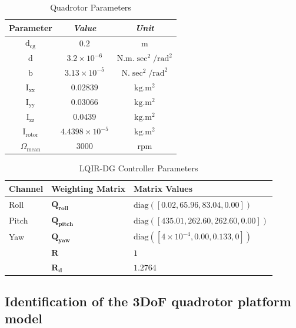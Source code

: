 \documentclass[3p,times]{elsarticle}
\begin{document}
\begin{table}[H]
	\renewcommand{\arraystretch}{1.3}
	\caption{Quadrotor Parameters}
	\begin{center}
	\begin{tabular}{c c c}
	\hline
	\textbf{Parameter} & \textbf{\textit{Value}}& \textbf{\textit{Unit}} \\
	\hline
	$\mathrm{d}_{\text{cg}}$  & $0.2$ & $\mathrm{m}$\\
	$\mathrm{d}$  & $3.2\times10^{-6}$ & $\mathrm{N.m.\sec^2/rad^2}$\\
	$\mathrm{b}$  & $3.13\times10^{-5}$ & $\mathrm{N.\sec^2/rad^2}$ \\
	$\mathrm{I}_{\text{xx}}$ & $0.02839$ & $\mathrm{kg.m^2}$ \\
	$\mathrm{I}_{\text{yy}}$  & $0.03066$ & $\mathrm{kg.m^2}$\\
	$\mathrm{I}_{\text{zz}}$  & $0.0439$ & $\mathrm{kg.m^2}$ \\
	$\mathrm{I}_{\text{rotor}}$  & $4.4398\times 10^{-5}$ & $\mathrm{kg.m^2}$\\
	
	
	$\Omega_{\text{mean}}$ & $3000$ & $\mathrm{rpm}$\\
	
	\hline
	\end{tabular}
	\label{tab:parameters}
	\end{center}
\end{table}


\begin{table}[H]
	\centering
	\caption{LQIR-DG Controller Parameters}
	\renewcommand{\arraystretch}{1.3}
	\begin{tabular}{@{}lll@{}}
	\toprule
	\textbf{Channel} & \textbf{Weighting Matrix} & \textbf{Matrix Values} \\
	\midrule
	Roll & $\mathbf{Q_{roll}}$ & $\text{diag}([0.02, 65.96, 83.04, 0.00])$ \\
	Pitch & $\mathbf{Q_{pitch}}$ & $\text{diag}([435.01, 262.60, 262.60, 0.00])$ \\
	Yaw & $\mathbf{Q_{yaw}}$ & $\text{diag}([4 \times 10^{-4}, 0.00, 0.133, 0])$ \\
	& $\mathbf{R}$ & $1$ \\
	&$\mathbf{R_d}$ & $1.2764$ \\
	\bottomrule
	\end{tabular}
	\label{tab:control weight_new}
\end{table}




\subsection{Identification of the 3DoF quadrotor platform model}
\end{document}
